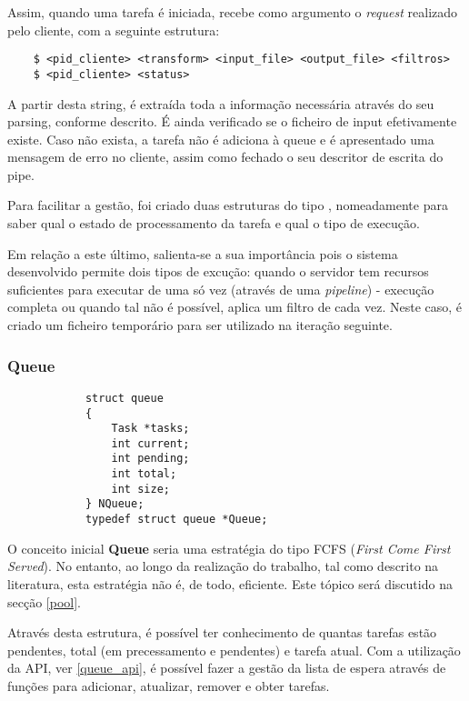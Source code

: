 \documentclass{article}
\begin{document}
Assim, quando uma tarefa é iniciada, recebe como argumento o \textit{request} realizado pelo cliente, com a
seguinte estrutura:
\begin{verbatim}
    $ <pid_cliente> <transform> <input_file> <output_file> <filtros>
    $ <pid_cliente> <status>
\end{verbatim}

A partir desta string, é extraída toda a informação necessária através do seu parsing, conforme descrito.
É ainda verificado se o ficheiro de input efetivamente existe. Caso não exista, a tarefa não é adiciona à queue
e é apresentado uma mensagem de erro no cliente, assim como fechado o seu descritor de escrita do pipe.

Para facilitar a gestão, foi criado duas estruturas do tipo , nomeadamente para saber qual o estado de processamento
da tarefa e qual o tipo de execução.

Em relação a este último, salienta-se a sua importância pois o sistema desenvolvido permite dois tipos de excução: quando
o servidor tem recursos suficientes para executar de uma só vez (através de uma \textit{pipeline}) - execução completa
ou quando tal não é possível, aplica um filtro de cada vez. Neste caso, é criado um ficheiro temporário para ser utilizado
na iteração seguinte.

\subsubsection{Queue}

\begin{verbatim}
            struct queue
            {
                Task *tasks;
                int current;
                int pending;
                int total;
                int size;
            } NQueue;
            typedef struct queue *Queue;
\end{verbatim}

O conceito inicial \textbf{Queue} seria uma estratégia do tipo FCFS (\textit{First Come First Served}).
No entanto, ao longo da realização do trabalho, tal como descrito na literatura, esta estratégia não é, de todo, eficiente.
Este tópico será discutido na secção \ref{pool}.

Através desta estrutura, é possível ter conhecimento de quantas tarefas estão pendentes, total (em precessamento e pendentes) e
tarefa atual. Com a utilização da API, ver \ref{queue_api}, é possível fazer a gestão da lista de espera através de funções
para adicionar, atualizar, remover e obter tarefas.
\end{document}
